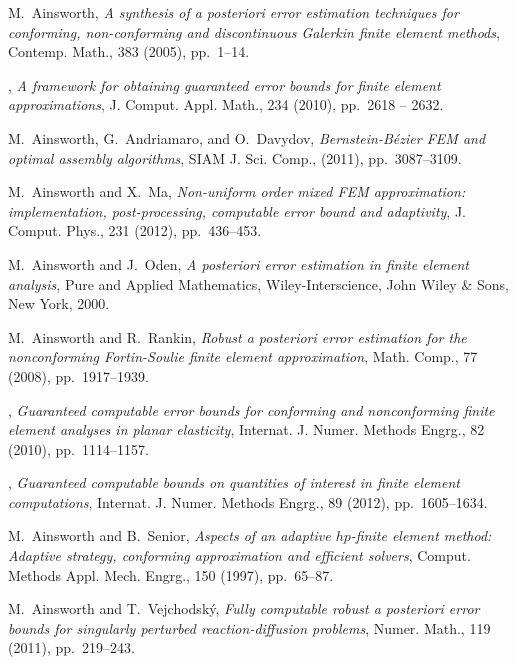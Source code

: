 \renewcommand{\refname}{\small\bf Selected Recent Publications}
%
%
\begin{thebibliography}{10}

{\sc M.~Ainsworth}, {\em A synthesis of a posteriori error estimation
  techniques for conforming, non-conforming and discontinuous {G}alerkin finite
  element methods}, Contemp. Math., 383 (2005), pp.~1--14.

\leavevmode\vrule height 2pt depth -1.6pt width 23pt, {\em A framework for
  obtaining guaranteed error bounds for finite element approximations}, J.
  Comput. Appl. Math., 234 (2010), pp.~2618 -- 2632.

{\sc M.~Ainsworth, G.~Andriamaro, and O.~Davydov}, {\em Bernstein-{B}\'ezier
  {FEM} and optimal assembly algorithms}, SIAM J. Sci. Comp.,  (2011),
  pp.~3087--3109.

{\sc M.~Ainsworth and X.~Ma}, {\em Non-uniform order mixed {FEM} approximation:
  implementation, post-processing, computable error bound and adaptivity}, J.
  Comput. Phys., 231 (2012), pp.~436--453.

{\sc M.~Ainsworth and J.~Oden}, {\em A posteriori error estimation in finite
  element analysis}, Pure and Applied Mathematics, Wiley-Interscience, John
  Wiley \& Sons, New York, 2000.

{\sc M.~Ainsworth and R.~Rankin}, {\em Robust a posteriori error estimation for
  the nonconforming {F}ortin-{S}oulie finite element approximation}, Math.
  Comp., 77 (2008), pp.~1917--1939.

\leavevmode\vrule height 2pt depth -1.6pt width 23pt, {\em Guaranteed
  computable error bounds for conforming and nonconforming finite element
  analyses in planar elasticity}, Internat. J. Numer. Methods Engrg., 82
  (2010), pp.~1114--1157.

\leavevmode\vrule height 2pt depth -1.6pt width 23pt, {\em Guaranteed
  computable bounds on quantities of interest in finite element computations},
  Internat. J. Numer. Methods Engrg., 89 (2012), pp.~1605--1634.

{\sc M.~Ainsworth and B.~Senior}, {\em Aspects of an adaptive $hp$-finite
  element method: Adaptive strategy, conforming approximation and efficient
  solvers}, Comput. Methods Appl. Mech. Engrg., 150 (1997), pp.~65--87.

{\sc M.~Ainsworth and T.~Vejchodsk{\'y}}, {\em Fully computable robust a
  posteriori error bounds for singularly perturbed reaction-diffusion
  problems}, Numer. Math., 119 (2011), pp.~219--243.

\end{thebibliography}


